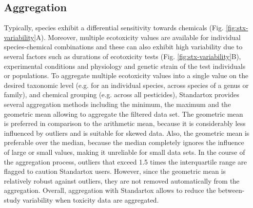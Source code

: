 \subsection{Aggregation}
Typically, species exhibit a differential sensitivity towards chemicals (Fig. \ref{fig:stx-variability}A). Moreover, multiple ecotoxicity values are available for individual species-chemical combinations and these can also exhibit high variability due to several factors such as durations of ecotoxicity tests (Fig. \ref{fig:stx-variability}B), experimental conditions and physiology and genetic strain of the test individuals or populations. To aggregate multiple ecotoxicity values into a single value on the desired taxonomic level (e.g. for an individual species, across species of a genus or family), and chemical grouping (e.g. across all pesticides), Standartox provides several aggregation methods including the minimum, the maximum and the geometric mean allowing to aggregate the filtered data set. The geometric mean is preferred in comparison to the arithmetic mean, because it is considerably less influenced by outliers and is suitable for skewed data. Also, the geometric mean is preferable over the median, because the median completely ignores the influence of large or small values, making it unreliable for small data sets. In the course of the aggregation process, outliers that exceed 1.5 times the interquartile range are flagged to caution Standartox users. However, since the geometric mean is relatively robust against outliers, they are not removed automatically from the aggregation. Overall, aggregation with Standartox allows to reduce the between-study variability when toxicity data are aggregated.

